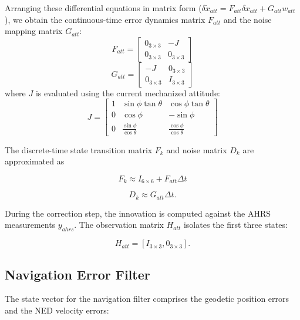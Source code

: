 \documentclass[a4paper,twoside,openany]{report}
\begin{document}
Arranging these differential equations in matrix form ($\delta\dot{x}_{att} = F_{att} \delta x_{att} + G_{att} w_{att}$), we obtain the continuous-time error dynamics matrix $F_{att}$ and the noise mapping matrix $G_{att}$:
\begin{equation}
    F_{att} = \begin{bmatrix} 0_{3\times3} & -J \\ 0_{3\times3} & 0_{3\times3} \end{bmatrix}
\end{equation}
\begin{equation}
    G_{att} = \begin{bmatrix} -J & 0_{3\times3} \\ 0_{3\times3} & I_{3\times3} \end{bmatrix}
\end{equation}
where $J$ is evaluated using the current mechanized attitude:
\begin{equation}
    J = \begin{bmatrix} 1 & \sin\phi \tan\theta & \cos\phi \tan\theta \\ 0 & \cos\phi & -\sin\phi \\ 0 & \frac{\sin\phi}{\cos\theta} & \frac{\cos\phi}{\cos\theta} \end{bmatrix}
\end{equation}

The discrete-time state transition matrix $F_k$ and noise matrix $D_k$ are approximated as

\begin{equation}
    F_k \approx I_{6\times6} + F_{att}\Delta t
\end{equation}

\begin{equation}
    D_k \approx G_{att}\Delta t.
\end{equation}

During the correction step, the innovation is computed against the AHRS measurements $y_{ahrs}$. The observation matrix $H_{att}$ isolates the first three states:

\begin{equation}
    H_{att} = [I_{3\times3},0_{3\times3}].
\end{equation}

\subsection{Navigation Error Filter}

The state vector for the navigation filter comprises the geodetic position errors and the NED velocity errors:
\end{document}
